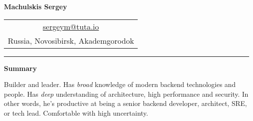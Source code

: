 \documentclass[final]{letter}
\begin{document}
\begin{center}

{\fontsize{25}{40}\selectfont\bf{Machulskis Sergey}}
  {\hfill
    \begin{tabular}{c}
        \href{mailto:sergeym@tuta.io}{sergeym@tuta.io}\\
        Russia, Novosibirsk, Akademgorodok
     \end{tabular}
  }
\rule{.98\textwidth}{1pt}

\addvspace{.1cm}

\end{center}
{\bf Summary}

Builder and leader. Has \textit{broad} knowledge of modern backend technologies and people. Has \textit{deep} understanding of architecture, high performance and security.
In other words, he's productive at being a senior backend developer, architect, SRE, or tech lead. Comfortable with high uncertainty.
\end{document}
